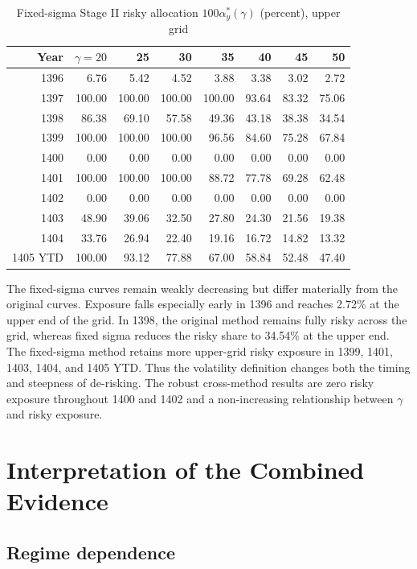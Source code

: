 \documentclass[11pt,a4paper]{article}
\begin{document}
\begin{landscape}
\begin{table}[p]
\centering
\scriptsize
\caption{Fixed-sigma Stage II risky allocation $100\alpha_y^*(\gamma)$ (percent), upper grid}
\begin{tabular}{rrrrrrrr}
\toprule
Year & $\gamma=20$ & 25 & 30 & 35 & 40 & 45 & 50 \\
\midrule
1396 & 6.76&5.42&4.52&3.88&3.38&3.02&2.72\\
1397 & 100.00&100.00&100.00&100.00&93.64&83.32&75.06\\
1398 & 86.38&69.10&57.58&49.36&43.18&38.38&34.54\\
1399 & 100.00&100.00&100.00&96.56&84.60&75.28&67.84\\
1400 & 0.00&0.00&0.00&0.00&0.00&0.00&0.00\\
1401 & 100.00&100.00&100.00&88.72&77.78&69.28&62.48\\
1402 & 0.00&0.00&0.00&0.00&0.00&0.00&0.00\\
1403 & 48.90&39.06&32.50&27.80&24.30&21.56&19.38\\
1404 & 33.76&26.94&22.40&19.16&16.72&14.82&13.32\\
1405 YTD & 100.00&93.12&77.88&67.00&58.84&52.48&47.40\\
\bottomrule
\end{tabular}
\end{table}
\end{landscape}

The fixed-sigma curves remain weakly decreasing but differ materially from the original curves.
Exposure falls especially early in 1396 and reaches 2.72\% at the upper end of the grid. In
1398, the original method remains fully risky across the grid, whereas fixed sigma reduces the
risky share to 34.54\% at the upper end. The fixed-sigma method retains more upper-grid risky
exposure in 1399, 1401, 1403, 1404, and 1405 YTD. Thus the volatility definition changes both
the timing and steepness of de-risking. The robust cross-method results are zero risky exposure
throughout 1400 and 1402 and a non-increasing relationship between $\gamma$ and risky exposure.

\section{Interpretation of the Combined Evidence}

\subsection{Regime dependence}
\end{document}
